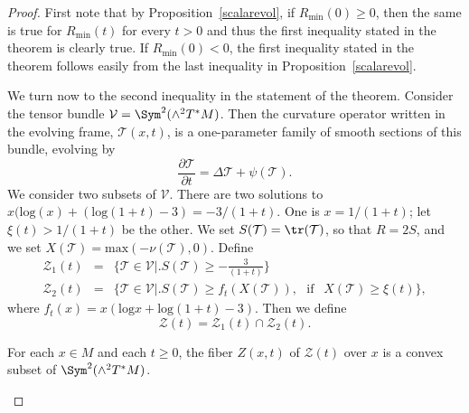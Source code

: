\begin{proof}
First note that by Proposition~\ref{scalarevol}, if $R_\mathrm{min}(0)\ge 0$, then the same is true for $R_\mathrm{min}(t)$ for every
$t>0$ and thus the first inequality stated in the theorem is clearly
true. If $R_\mathrm{min}(0)<0$, the first inequality stated in the
theorem follows easily from the last inequality in
Proposition~\ref{scalarevol}.

We turn now to the second inequality in the statement of the
theorem. Consider the tensor bundle ${\mathcal V}=\Sym^2(\wedge^2T^*M)$. Then the curvature operator written in the
evolving frame, ${\mathcal T}(x,t)$, is a one-parameter family of
smooth sections of this bundle, evolving by
$$\frac{\partial{\mathcal T}}{\partial t}=
\Delta{\mathcal T}+\psi({\mathcal T}).$$ We consider two subsets of ${\mathcal
V}$. There are two solutions to $x(\mathrm{log}(x)+(\mathrm{log}(1+t)-3)=-3/(1+t)$.
One is $x=1/(1+t)$; let $\xi(t)>1/(1+t)$ be the other. We set $S({\mathcal
T})=\tr({\mathcal T})$, so that $R=2S$, and we set $X({\mathcal T})=\mathrm{max}(-\nu({\mathcal T}),0)$. Define
\begin{eqnarray*}
 {\mathcal Z}_1(t) & = & \{{\mathcal T}\in {\mathcal V}\bigl|\bigr.
 S({\mathcal T})\geq-\frac{3}{(1+t)}\} \\
{\mathcal Z}_2(t) & = & \{ {\mathcal T}\in {\mathcal
V}\bigl|\bigr.S({\mathcal T})\geq f_t(X({\mathcal T})),\ \ \
\text{if }\ \ X( {\mathcal T})\geq\xi(t)\},
\end{eqnarray*}
where $f_t(x)=x(\mathrm{log}x+\mathrm{log}(1+t)-3)$. Then we define
$${\mathcal Z}(t)={\mathcal Z}_1(t)\cap {\mathcal Z}_2(t).$$




\begin{claim}
\label{claim:pinching-region-convex}
For each $x\in M$ and each $t\ge 0$, the fiber $Z(x,t)$ of
${\mathcal Z}(t)$ over $x$  is a convex subset of $\Sym^2(\wedge^2T^*M)$.
\end{claim}



\end{proof}
